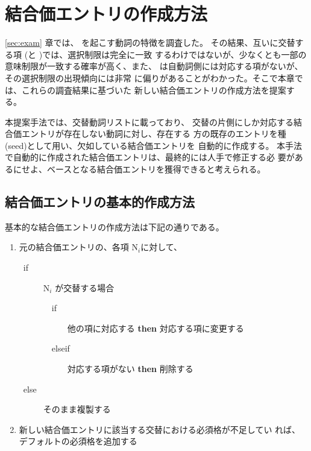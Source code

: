 \documentclass[japanese]{jnlp}
\newcommand{\abs}{}
\newcommand{\sbj}{}
\newcommand{\obj}{}
\newcommand{\soalt}{}
\begin{document}
\section{結合価エントリの作成方法} \label{sec:create-method}

\ref{sec:exam} 章では、\soalt{} を起こす動詞の特徴を調査した。
その結果、互いに交替する項 (\sbj{}と \obj{})では、選択制限は完全に一致
するわけではないが、少なくとも一部の意味制限が一致する確率が高く、また、
\abs{}は自動詞側には対応する項がないが、その選択制限の出現傾向には非常
に偏りがあることがわかった。そこで本章では、これらの調査結果に基づいた
新しい結合価エントリの作成方法を提案する。


本提案手法では、交替動詞リストに載っており、
交替の片側にしか対応する結合価エントリが存在しない動詞に対し、存在する
方の既存のエントリを種 (seed)として用い、欠如している結合価エントリを
自動的に作成する。
本手法で自動的に作成された結合価エントリは、最終的には人手で修正する必
要があるにせよ、ベースとなる結合価エントリを獲得できると考えられる。




\subsection{結合価エントリの基本的作成方法} \label{sec:basic-method} 


基本的な結合価エントリの作成方法は下記の通りである。

\begin{enumerate}
\item 元の結合価エントリの、各項 N$_i$に対して、
  \begin{description}
   \item [\ if]\hspace{3mm} N$_i$ が交替する場合
     \begin{description}
     \item [\ \ if]\hspace{3mm} 他の項に対応する \textbf{then}
       対応する項に変更する
     \item [\ \ elseif]\hspace{3mm} 対応する項がない \textbf{then}
       削除する
       \end{description}
   \item [\ else]\hspace{3mm}
     そのまま複製する
     \end{description}
   \item 新しい結合価エントリに該当する交替における必須格が不足してい
     れば、デフォルトの必須格を追加する
 \end{enumerate}
 
\end{document}
